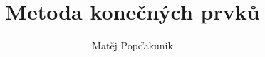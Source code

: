 \documentclass{article}
\title{Metoda konečných prvků}
\author{Matěj Popďakunik}
\begin{document}
\newcommand{\continuous}[2][\Omega]{\mathcal{C}^{(#2)}(#1)}





\maketitle




\end{document}
